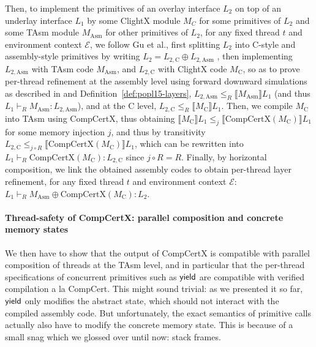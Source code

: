 Then, to implement the primitives of an overlay interface $L_2$ on top
of an underlay interface $L_1$ by some ClightX module $M_C$ for some
primitives of $L_2$ and some TAsm module $M_{\text{Asm}}$ for other
primitives of $L_2$, for any fixed thread $t$ and environment context
$\mathcal E$, we follow Gu et al., first splitting $L_2$ into C-style
and assembly-style primitives by writing $L_2 = L_{2, \text{C}} \oplus
L_{2, \text{Asm}}$ , then implementing $L_{2, \text{Asm}}$ with TAsm
code $M_{\text{Asm}}$, and $L_{2, \text{C}}$ with ClightX code
$M_{\text{C}}$, so as to prove per-thread refinement at the assembly
level using forward downward simulations as described in \cite[\S
  3.3]{dscal15} and Definition~\ref{def:popl15-layers}, $L_{2,
  \text{Asm}} \leqslant_R \llbracket M_{\text{Asm}} \rrbracket L_1$
(and thus $L_{1} \vdash_R M_{\text{Asm}} : L_{2, \text{Asm}}$), and at
the C level, $L_{2, \text{C}} \leqslant_R \llbracket M_{\text{C}}
\rrbracket L_1$. Then, we compile $M_{\text{C}}$ into TAsm using
CompCertX, thus obtaining $\llbracket M_{\text{C}} \rrbracket L_1
\leqslant_{j} \llbracket \text{CompCertX}(M_{\text{C}}) \rrbracket
L_1$ for some memory injection $j$, and thus by transitivity $L_{2,
  \text{C}} \leqslant_{j \circ R} \llbracket
\text{CompCertX}(M_{\text{C}}) \rrbracket L_1$, which can be rewritten
into $L_{1} \vdash_R \text{CompCertX}(M_{\text{C}}) : L_{2, \text{C}}$
since $j \circ R = R$. Finally, by horizontal composition, we link the
obtained assembly codes to obtain per-thread layer refinement, for any
fixed thread $t$ and environment context $\mathcal E$: $L_1 \vdash_R
M_{\text{Asm}} \oplus \text{CompCertX}(M_{\text{C}}) : L_2$.

\paragraph{Thread-safety of CompCertX: parallel composition and concrete memory states}

We then have to show that the output of CompCertX is compatible with
parallel composition of threads at the TAsm level, and in particular
that the per-thread specifications of concurrent primitives such as
$\mathsf{yield}$ are compatible with verified compilation a la CompCert.  This
might sound trivial: as we presented it so far, $\mathsf{yield}$ only modifies
the abstract state, which should not interact with the compiled
assembly code. But unfortunately, the exact semantics of primitive
calls actually also have to modify the concrete memory state. This is because
of a small snag which we glossed over until now: stack frames.

